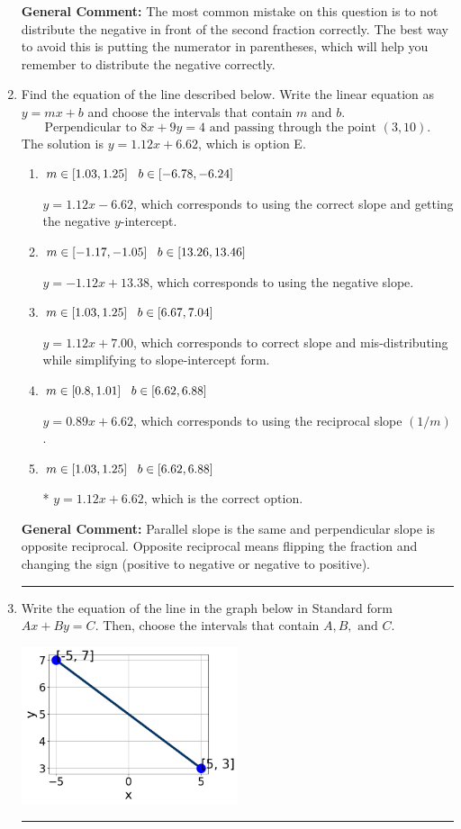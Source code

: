 \documentclass{extbook}[14pt]
\newcommand{\litem}[1]{\item #1

\rule{\textwidth}{0.4pt}}
\begin{document}
\begin{enumerate}
{\textbf{General Comment:} The most common mistake on this question is to not distribute the negative in front of the second fraction correctly. The best way to avoid this is putting the numerator in parentheses, which will help you remember to distribute the negative correctly.
}
\litem{
Find the equation of the line described below. Write the linear equation as $ y=mx+b $ and choose the intervals that contain $m$ and $b$.
\[ \text{Perpendicular to } 8 x + 9 y = 4 \text{ and passing through the point } (3, 10). \]The solution is \( y = 1.12x + 6.62 \), which is option E.\begin{enumerate}[label=\Alph*.]
\item \( m \in [1.03, 1.25] \hspace*{3mm} b \in [-6.78, -6.24] \)

 $y = 1.12x - 6.62$, which corresponds to using the correct slope and getting the negative $y$-intercept.
\item \( m \in [-1.17, -1.05] \hspace*{3mm} b \in [13.26, 13.46] \)

 $y = -1.12x + 13.38$, which corresponds to using the negative slope.
\item \( m \in [1.03, 1.25] \hspace*{3mm} b \in [6.67, 7.04] \)

 $y = 1.12x + 7.00$, which corresponds to correct slope and mis-distributing while simplifying to slope-intercept form.
\item \( m \in [0.8, 1.01] \hspace*{3mm} b \in [6.62, 6.88] \)

 $y = 0.89x + 6.62$, which corresponds to using the reciprocal slope $(1/m)$.
\item \( m \in [1.03, 1.25] \hspace*{3mm} b \in [6.62, 6.88] \)

* $y = 1.12x + 6.62$, which is the correct option.
\end{enumerate}

\textbf{General Comment:} Parallel slope is the same and perpendicular slope is opposite reciprocal. Opposite reciprocal means flipping the fraction and changing the sign (positive to negative or negative to positive).
}
\litem{
Write the equation of the line in the graph below in Standard form $Ax+By=C$. Then, choose the intervals that contain $A, B, \text{ and } C$.

\begin{center}
    \includegraphics[width=0.5\textwidth]{../Figures/linearGraphToStandardCopyC.png}
\end{center}


}
\end{enumerate}
\end{document}
